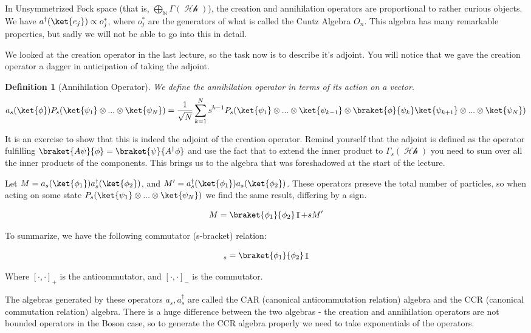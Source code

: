 \documentclass{article}
\DeclareMathOperator{\Hh}{\mathcal{Hh}}
\DeclareMathOperator{\NN}{\mathbb{N}}
\DeclareMathOperator{\II}{\mathbb{I}}
\newcommand{\create}[1]{a^\dagger_s(#1)}
\newcommand{\annih}[1]{a_s(#1)}
\newtheorem{defn}{Definition}
\begin{document}
In Unsymmetrized Fock space (that is, $\bigoplus_{\NN} \Gamma(\Hh)$), the creation and annihilation operators are proportional to rather curious objects. We have $a^\dagger(\ket{e_j}) \propto o^*_j$, where $o_j^*$ are the generators of what is called the Cuntz Algebra $O_n$. This algebra has many remarkable properties, but sadly we will not be able to go into this in detail.

We looked at the creation operator in the last lecture, so the task now is to describe it's adjoint. You will notice that we gave the creation operator a dagger in anticipation of taking the adjoint. 

\begin{defn}[Annihilation Operator] We define the annihilation operator in terms of its action on a vector.
\begin{equation}
a_s(\ket{\phi})P_s(\ket{\psi_1}\otimes...\otimes\ket{\psi_N})
= \frac{1}{\sqrt{N}}\sum_{k=1}^N s^{k-1} P_s(\ket{\psi_1}\otimes...\otimes\ket{\psi_{k-1}}\otimes\braket{\phi}{\psi_k}\ket{\psi_{k+1}}\otimes...\otimes\ket{\psi_N})
\end{equation}
\end{defn}

It is an exercise to show that this is indeed the adjoint of the creation operator. Remind yourself that the adjoint is defined as the operator fulfilling $\braket{A\psi}{\phi}=\braket{\psi}{A^\dagger \phi}$ and use the fact that to extend the inner product to $\Gamma_s(\Hh)$ you need to sum over all the inner products of the components. This brings us to the algebra that was foreshadowed at the start of the lecture.

Let $M = \annih{\ket{\phi_1}}\create{\ket{\phi_2}}$, and $M'=\create{\ket{\phi_1}}\annih{\ket{\phi_2}}$. These operators preseve the total number of particles, so when acting on some state $P_s(\ket{\psi_1}\otimes...\otimes\ket{\psi_N})$ we find the same result, differing by a sign.

\[M=\braket{\phi_1}{\phi_2}\II+sM'\]

To summarize, we have the following commutator (s-bracket) relation:

\begin{equation}
[\create{\ket{\phi_1}},\annih{\ket{\phi_2}}]_s=\braket{\phi_1}{\phi_2}\II
\end{equation}

Where $[\cdot,\cdot]_+$ is the anticommutator, and $[\cdot,\cdot]_-$ is the commutator.

The algebras generated by these operators $a_s,a^\dagger_s$ are called the CAR (canonical anticommutation relation) algebra and the CCR (canonical commutation relation) algebra. There is a huge difference between the two algebras - the creation and annihilation operators are not bounded operators in the Boson case, so to generate the CCR algebra properly we need to take exponentials of the operators. 
\end{document}
